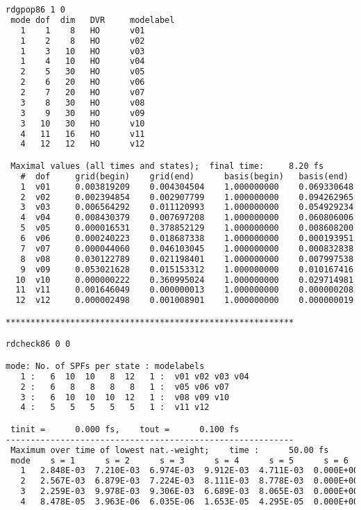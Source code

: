 \begin{lstlisting}[frame=single, language=xml]
rdgpop86 1 0
 mode dof  dim   DVR     modelabel
   1    1    8   HO      v01
   1    2    8   HO      v02
   1    3   10   HO      v03
   1    4   10   HO      v04
   2    5   30   HO      v05
   2    6   20   HO      v06
   2    7   20   HO      v07
   3    8   30   HO      v08
   3    9   30   HO      v09
   3   10   30   HO      v10
   4   11   16   HO      v11
   4   12   12   HO      v12

 Maximal values (all times and states);  final time:     8.20 fs
   #  dof     grid(begin)    grid(end)      basis(begin)   basis(end)
   1  v01     0.003819209    0.004304504    1.000000000    0.069330648
   2  v02     0.002394854    0.002907799    1.000000000    0.094262965
   3  v03     0.006564292    0.011120993    1.000000000    0.054929234
   4  v04     0.008430379    0.007697208    1.000000000    0.060806006
   5  v05     0.000016531    0.378852129    1.000000000    0.008608200 /*bf*/
   6  v06     0.000240223    0.018687338    1.000000000    0.000193951
   7  v07     0.000044060    0.046103045    1.000000000    0.000832838
   8  v08     0.030122789    0.021198401    1.000000000    0.007997538
   9  v09     0.053021628    0.015153312    1.000000000    0.010167416
  10  v10     0.000000222    0.360995024    1.000000000    0.029714981 /*bf*/
  11  v11     0.001646049    0.000000013    1.000000000    0.000000208
  12  v12     0.000002498    0.001008901    1.000000000    0.000000019

**********************************************************

rdcheck86 0 0

mode: No. of SPFs per state : modelabels
   1 :   6  10  10   8  12   1 :  v01 v02 v03 v04
   2 :   6   8   8   8   8   1 :  v05 v06 v07
   3 :   6  10  10  10  12   1 :  v08 v09 v10
   4 :   5   5   5   5   5   1 :  v11 v12

 tinit =      0.000 fs,    tout =      0.100 fs
----------------------------------------------------------
 Maximum over time of lowest nat.-weight;    time :      50.00 fs
 mode    s = 1      s = 2      s = 3      s = 4      s = 5      s = 6
   1   2.848E-03  7.210E-03  6.974E-03  9.912E-03  4.711E-03  0.000E+00
   2   2.567E-03  6.879E-03  7.224E-03  8.111E-03  8.778E-03  0.000E+00
   3   2.259E-03  9.978E-03  9.306E-03  6.689E-03  8.065E-03  0.000E+00
   4   8.478E-05  3.963E-06  6.035E-06  1.653E-05  4.295E-05  0.000E+00

\end{lstlisting}

